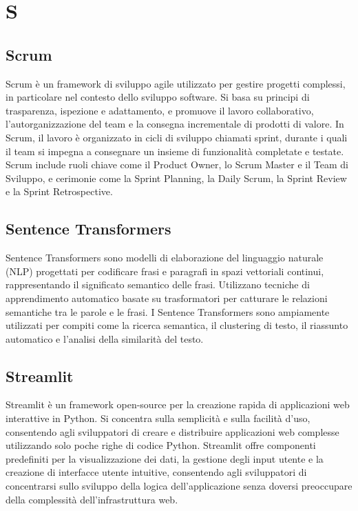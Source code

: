 \section{S}

\vspace{2em}
\subsection*{Scrum}
Scrum è un framework di sviluppo agile utilizzato per gestire progetti complessi, in particolare nel contesto dello sviluppo software. Si basa su principi di trasparenza, ispezione e adattamento, e promuove il lavoro collaborativo, l'autorganizzazione del team e la consegna incrementale di prodotti di valore. In Scrum, il lavoro è organizzato in cicli di sviluppo chiamati sprint, durante i quali il team si impegna a consegnare un insieme di funzionalità completate e testate. Scrum include ruoli chiave come il Product Owner, lo Scrum Master e il Team di Sviluppo, e cerimonie come la Sprint Planning, la Daily Scrum, la Sprint Review e la Sprint Retrospective.

\vspace{2em}
\subsection*{Sentence Transformers}
Sentence Transformers sono modelli di elaborazione del linguaggio naturale (NLP) progettati per codificare frasi e paragrafi in spazi vettoriali continui, rappresentando il significato semantico delle frasi. Utilizzano tecniche di apprendimento automatico basate su trasformatori per catturare le relazioni semantiche tra le parole e le frasi. I Sentence Transformers sono ampiamente utilizzati per compiti come la ricerca semantica, il clustering di testo, il riassunto automatico e l'analisi della similarità del testo.

\vspace{2em}
\subsection*{Streamlit}
Streamlit è un framework open-source per la creazione rapida di applicazioni web interattive in Python. Si concentra sulla semplicità e sulla facilità d'uso, consentendo agli sviluppatori di creare e distribuire applicazioni web complesse utilizzando solo poche righe di codice Python. Streamlit offre componenti predefiniti per la visualizzazione dei dati, la gestione degli input utente e la creazione di interfacce utente intuitive, consentendo agli sviluppatori di concentrarsi sullo sviluppo della logica dell'applicazione senza doversi preoccupare della complessità dell'infrastruttura web.




